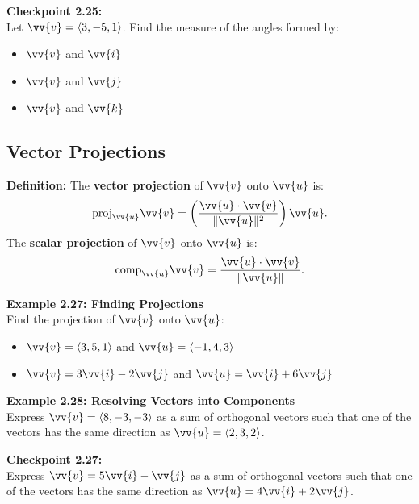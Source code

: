 \documentclass{article}
\begin{document}
\begin{exercisebox}
    \textbf{Checkpoint 2.25:} \\
    Let \(\vv{v} = \langle 3, -5, 1 \rangle\). Find the measure of the angles formed by:
    \begin{itemize}
        \item \(\vv{v}\) and \(\vv{i}\)
        \item \(\vv{v}\) and \(\vv{j}\)
        \item \(\vv{v}\) and \(\vv{k}\)
    \end{itemize}
\end{exercisebox}

\subsection*{Vector Projections}

\begin{definitionbox}
    \textbf{Definition:} The \textbf{vector projection} of \(\vv{v}\) onto \(\vv{u}\) is:
    \[
    \text{proj}_{\vv{u}} \vv{v} = \left( \frac{\vv{u} \cdot \vv{v}}{\|\vv{u}\|^2} \right) \vv{u}.
    \]
    The \textbf{scalar projection} of \(\vv{v}\) onto \(\vv{u}\) is:
    \[
    \text{comp}_{\vv{u}} \vv{v} = \frac{\vv{u} \cdot \vv{v}}{\|\vv{u}\|}.
    \]
\end{definitionbox}

\begin{examplebox}
    \textbf{Example 2.27: Finding Projections} \\
    Find the projection of \(\vv{v}\) onto \(\vv{u}\):
    \begin{itemize}
        \item \(\vv{v} = \langle 3, 5, 1 \rangle\) and \(\vv{u} = \langle -1, 4, 3 \rangle\)
        \item \(\vv{v} = 3\vv{i} - 2\vv{j}\) and \(\vv{u} = \vv{i} + 6\vv{j}\)
    \end{itemize}
\end{examplebox}

\begin{examplebox}
    \textbf{Example 2.28: Resolving Vectors into Components} \\
    Express \(\vv{v} = \langle 8, -3, -3 \rangle\) as a sum of orthogonal vectors such that one of the vectors has the same direction as \(\vv{u} = \langle 2, 3, 2 \rangle\).
\end{examplebox}

\begin{exercisebox}
    \textbf{Checkpoint 2.27:} \\
    Express \(\vv{v} = 5\vv{i} - \vv{j}\) as a sum of orthogonal vectors such that one of the vectors has the same direction as \(\vv{u} = 4\vv{i} + 2\vv{j}\).
\end{exercisebox}
\end{document}
